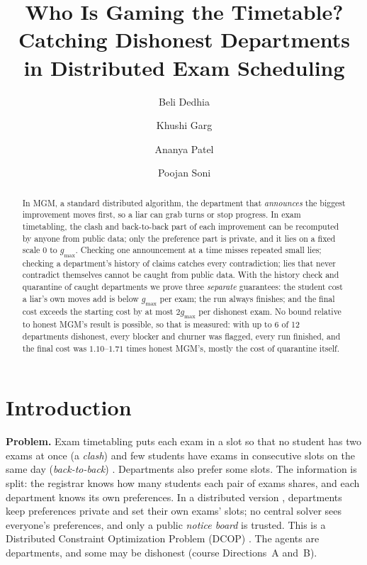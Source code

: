 \documentclass{article}
\title{Who Is Gaming the Timetable? Catching Dishonest Departments\\ in Distributed Exam Scheduling}
\date{}
\author{Beli Dedhia}
\author{Khushi Garg}
\author{Ananya Patel}
\author{Poojan Soni}
\affil{Indian Institute of Technology Gandhinagar}
\theoremstyle{definition}
\newcommand{\1}{\mathbf{1}}
\newcommand{\gmax}{g_{\max}}
\begin{document}
\maketitle
\vspace{-2.2em}
\begin{abstract}
In MGM, a standard distributed algorithm, the department that \emph{announces} the biggest improvement moves first, so a liar can grab turns or stop progress. In exam timetabling, the clash and back-to-back part of each improvement can be recomputed by anyone from public data; only the preference part is private, and it lies on a fixed scale $0$ to $\gmax$. Checking one announcement at a time misses repeated small lies; checking a department's history of claims catches every contradiction; lies that never contradict themselves cannot be caught from public data. With the history check and quarantine of caught departments we prove three \emph{separate} guarantees: the student cost a liar's own moves add is below $\gmax$ per exam; the run always finishes; and the final cost exceeds the starting cost by at most $2\gmax$ per dishonest exam. No bound relative to honest MGM's result is possible, so that is measured: with up to 6 of 12 departments dishonest, every blocker and churner was flagged, every run finished, and the final cost was $1.10$--$1.71$ times honest MGM's, mostly the cost of quarantine itself.
\end{abstract}

\section{Introduction}
\textbf{Problem.} Exam timetabling puts each exam in a slot so that no student has two exams at once (a \emph{clash}) and few students have exams in consecutive slots on the same day (\emph{back-to-back}) \citep{carter1996}. Departments also prefer some slots. The information is split: the registrar knows how many students each pair of exams shares, and each department knows its own preferences. In a distributed version \citep{meisels2003}, departments keep preferences private and set their own exams' slots; no central solver sees everyone's preferences, and only a public \emph{notice board} is trusted. This is a Distributed Constraint Optimization Problem (DCOP) \citep{yokoo1998,fioretto2018}. The agents are departments, and some may be dishonest (course Directions~A and~B).
\end{document}
